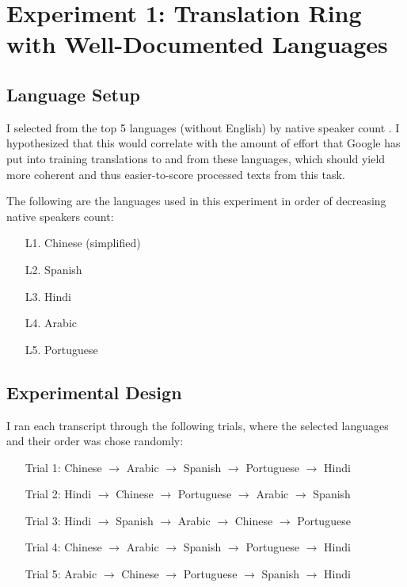 \documentclass{article}
\begin{document}
\section{Experiment 1: Translation Ring with Well-Documented Languages}\subsection{Language Setup}


I selected from the top 5 languages (without English) by native speaker count . I hypothesized that this would correlate with the amount of effort that Google has put into training translations to and from these languages, which should yield more coherent and thus easier-to-score processed texts from this task.




\vspace{1em} \noindent
The following are the languages used in this experiment in order of decreasing native speakers count:
\begin{enumerate}
  \item[L1.] Chinese (simplified)
  \item[L2.] Spanish
  \item[L3.] Hindi
  \item[L4.] Arabic
  \item[L5.] Portuguese
\end{enumerate}

\subsection{Experimental Design}


I ran each transcript through the following trials, where the selected languages and their order was chose randomly:
\begin{enumerate}
  \item[] Trial 1: Chinese $\rightarrow$ Arabic $\rightarrow$ Spanish $\rightarrow$ Portuguese $\rightarrow$ Hindi
  \item[] Trial 2: Hindi $\rightarrow$ Chinese $\rightarrow$ Portuguese $\rightarrow$ Arabic $\rightarrow$ Spanish
  \item[] Trial 3: Hindi $\rightarrow$ Spanish $\rightarrow$ Arabic $\rightarrow$ Chinese $\rightarrow$ Portuguese
  \item[] Trial 4: Chinese $\rightarrow$ Arabic $\rightarrow$ Spanish $\rightarrow$ Portuguese $\rightarrow$ Hindi
  \item[] Trial 5: Arabic $\rightarrow$ Chinese $\rightarrow$ Portuguese $\rightarrow$ Spanish $\rightarrow$ Hindi
\end{enumerate}
\end{document}
